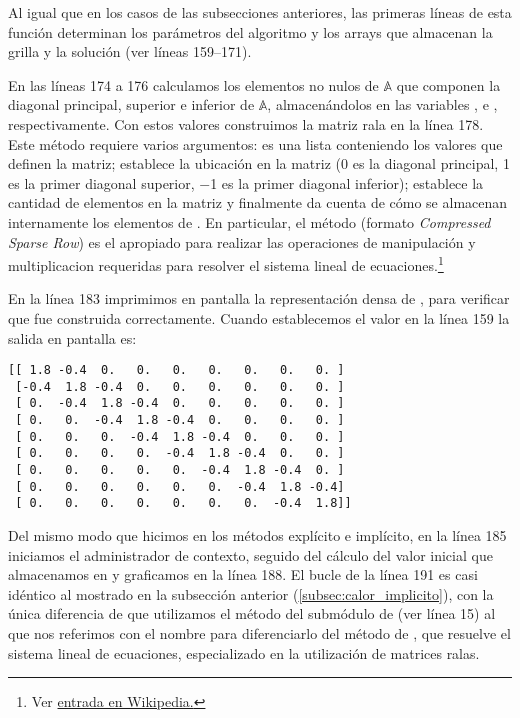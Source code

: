 
Al igual que en los casos de las subsecciones anteriores, las primeras líneas de esta función determinan los parámetros del algoritmo y los arrays que almacenan la grilla y la solución (ver líneas 159--171).

En las líneas 174 a 176 calculamos los elementos no nulos de $\mathbb{A}$ que componen la diagonal principal, superior e inferior de $\mathbb{A}$, almacenándolos en las variables ,  e , respectivamente. Con estos valores construimos la matriz rala  en la línea 178. Este método requiere varios argumentos:  es una lista conteniendo los valores que definen la matriz;  establece la ubicación en la matriz (0 es la diagonal principal, 1 es la primer diagonal superior, $-$1 es la primer diagonal inferior);  establece la cantidad de elementos en la matriz y finalmente  da cuenta de cómo se almacenan internamente los elementos de . En particular, el método  (formato \textit{Compressed Sparse Row}) es el apropiado para realizar las operaciones de manipulación y multiplicacion requeridas para resolver el sistema lineal de ecuaciones.\footnote{Ver \href{https://en.wikipedia.org/wiki/Sparse_matrix}{entrada en Wikipedia.}}

En la línea 183 imprimimos en pantalla la representación densa de , para verificar que fue construida correctamente. Cuando establecemos el valor  en la línea 159 la salida en pantalla es:

\begin{verbatim}
[[ 1.8 -0.4  0.   0.   0.   0.   0.   0.   0. ]
 [-0.4  1.8 -0.4  0.   0.   0.   0.   0.   0. ]
 [ 0.  -0.4  1.8 -0.4  0.   0.   0.   0.   0. ]
 [ 0.   0.  -0.4  1.8 -0.4  0.   0.   0.   0. ]
 [ 0.   0.   0.  -0.4  1.8 -0.4  0.   0.   0. ]
 [ 0.   0.   0.   0.  -0.4  1.8 -0.4  0.   0. ]
 [ 0.   0.   0.   0.   0.  -0.4  1.8 -0.4  0. ]
 [ 0.   0.   0.   0.   0.   0.  -0.4  1.8 -0.4]
 [ 0.   0.   0.   0.   0.   0.   0.  -0.4  1.8]]
\end{verbatim}

Del mismo modo que hicimos en los métodos explícito e implícito, en la línea 185 iniciamos el administrador de contexto, seguido del cálculo del valor inicial que almacenamos en  y graficamos en la línea 188. El bucle  de la línea 191 es casi idéntico al mostrado en la subsección anterior (\ref{subsec:calor_implicito}), con la única diferencia de que utilizamos el método  del submódulo  de  (ver línea 15) al que nos referimos con el nombre  para diferenciarlo del método  de , que resuelve el sistema lineal de ecuaciones, especializado en la utilización de matrices ralas.

